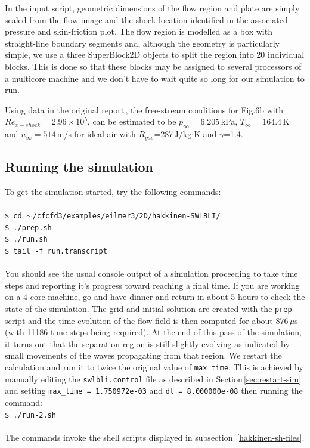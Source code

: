 \medskip
In the input script, geometric dimensions of the flow region and plate are simply scaled
from the flow image and the shock location identified in the associated pressure and skin-friction plot.
The flow region is modelled as a box with straight-line boundary segments and,
although the geometry is particularly simple, we use a three SuperBlock2D objects to split the region
into 20 individual blocks.
This is done so that these blocks may be assigned to several processors of a multicore machine and we
don't have to wait quite so long for our simulation to run.

\medskip
Using data in the original report\,\cite{hakkinen_etal_59}, the free-stream conditions for Fig.6b 
with $Re_{x-shock} = 2.96 \times 10^5$,
can be estimated to be $p_{\infty} = 6.205$\,kPa, $T_{\infty} = 164.4$\,K and $u_{\infty} = 514$\,m/s 
for ideal air with $R_{gas}$=287\,J/kg$\cdot$K and $\gamma$=1.4.

\noindent
\topbar

\bottombar


\bigskip
\subsection{Running the simulation}
%
To get the simulation started, try the following commands:\\
%
\topbar\\
\texttt{\$ cd $\sim$/cfcfd3/examples/eilmer3/2D/hakkinen-SWLBLI/}\\
\texttt{\$ ./prep.sh}\\
\texttt{\$ ./run.sh}\\
\texttt{\$ tail -f run.transcript}\\
\bottombar\\
%
You should see the usual console output of a simulation proceeding to take time steps
and reporting it's progress toward reaching a final time.
If you are working on a 4-core machine, go and have dinner and return
in about 5 hours to check the state of the simulation.
The grid and initial solution are created with the \texttt{prep} script
and the time-evolution of the flow field is then computed for about 876\,$\mu$s 
(with 11186 time steps being required).
At the end of this pass of the simulation, it turns out that 
the separation region is still slightly evolving as indicated by small movements of the waves
propagating from that region.
We restart the calculation
and run it to twice the original value of \verb!max_time!.
This is achieved by manually editing the \texttt{swlbli.control} file
as described in Section\,\ref{sec:restart-sim} and setting
\verb!max_time = 1.750972e-03! and \verb!dt = 8.000000e-08! then running the command:
\topbar\\
\texttt{\$ ./run-2.sh}\\
\bottombar\\
The commands invoke the shell scripts displayed in 
subsection~\ref{hakkinen-sh-files}.

